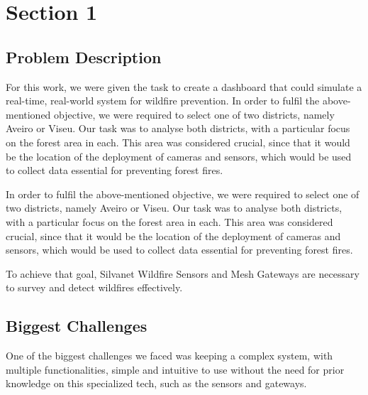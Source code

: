 \chapter{Section 1} \label{section1}
\section{Problem Description}
For this work, we were given the task to create a dashboard 
that could simulate a real-time, real-world system for wildfire 
prevention. In order to fulfil the above-mentioned objective, we were required to select one of two districts, namely Aveiro or Viseu. Our task was to analyse both districts, with a particular focus on the forest area in each. This area was considered crucial, since that it would be the location of the deployment of cameras and sensors, which would be used to collect data essential for preventing forest fires. \par
In order to fulfil the above-mentioned objective, we were required to select one of two districts, namely Aveiro or Viseu. Our task was to analyse both districts, with a particular focus on the forest area in each. This area was considered crucial, since that it would be the location of the deployment of cameras and sensors, which would be used to collect data essential for preventing forest fires. \par
To achieve
that goal, Silvanet Wildfire Sensors and Mesh Gateways are necessary to
survey and detect wildfires effectively. 
\section{Biggest Challenges}
One of the biggest challenges we faced was keeping a complex system, with multiple functionalities, simple
and intuitive to use without the need for prior knowledge on this
specialized tech, such as the sensors and gateways. 

